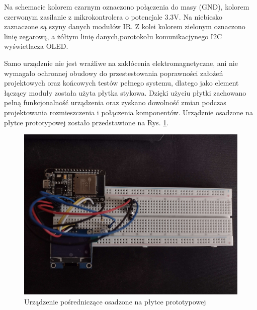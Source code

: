 \documentclass[12pt,twoside,draft]{article}
\begin{document}
Na schemacie kolorem czarnym oznaczono połączenia do masy (GND), kolorem czerwonym zasilanie z mikrokontrolera o potencjale 3.3V. Na niebiesko zaznaczone są szyny danych modułów IR. Z kolei kolorem zielonym oznaczono linię zegarową, a żółtym linię danych,porotokołu komunikacjynego I2C wyświetlacza OLED.

Samo urządznie nie jest wrażliwe na zakłócenia elektromagnetyczne, ani nie wymagało ochronnej obudowy do przestestowania poprawności założeń projektowych oraz końcowych testów pełnego systemu, dlatego jako element łączący moduły została użyta płytka stykowa. Dzięki użyciu płytki zachowano pełną funkcjonalność urządzenia oraz zyskano dowolność zmian podczas projektowania rozmieszczenia i połączenia komponentów. Urządznie osadzone na płytce prototypowej zostało przedstawione na Rys. \ref*{Fig:deviceOnBoard}.
\begin{figure}[ht]
   \centering
   \includegraphics[width=12cm]{images/deviceOnBoard.jpg}
   \caption{Urządzenie pośredniczące osadzone na płytce prototypowej}
   \label{Fig:deviceOnBoard}
\end{figure}
\end{document}
